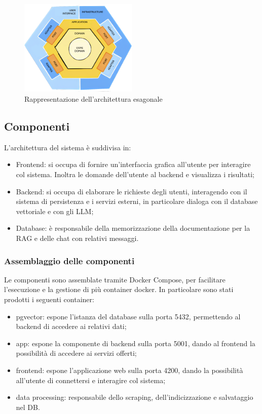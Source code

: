 \begin{figure}[H]
    \centering
    \includegraphics[width=0.5\textwidth]{images/HEX.png}
    \caption{Rappresentazione dell'architettura esagonale}
    \label{fig:architettura}
\end{figure}

\subsection{Componenti}
L'architettura del sistema è suddivisa in:
\begin{itemize}
    \item Frontend: si occupa di fornire un'interfaccia grafica all'utente per interagire col sistema. Inoltra le domande dell'utente al backend e visualizza i risultati;
    \item Backend: si occupa di elaborare le richieste degli utenti, interagendo con il sistema di persistenza e i servizi esterni, in particolare dialoga con il database vettoriale e con gli LLM;
    \item Database: è responsabile della memorizzazione della documentazione per la RAG e delle chat con relativi messaggi.
\end{itemize}
\subsubsection{Assemblaggio delle componenti}
Le componenti sono assemblate tramite Docker Compose, per facilitare l'esecuzione e la gestione di più container docker. 
In particolare sono stati prodotti i seguenti container:
\begin{itemize}
    \item pgvector: espone l'istanza del database sulla porta 5432, permettendo al backend di accedere ai relativi dati;
    \item app: espone la componente di backend sulla porta 5001, dando al frontend la possibilità di accedere ai servizi offerti;
    \item frontend: espone l'applicazione web sulla porta 4200, dando la possibilità all'utente di connettersi e interagire col sistema;
    \item data processing: responsabile dello scraping, dell'indicizzazione e salvataggio nel DB.
\end{itemize}
